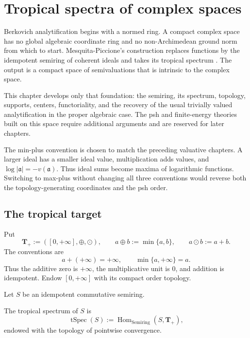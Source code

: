 \chapter{Tropical spectra of complex spaces}
\label{chap:tropical-spectra-complex}

Berkovich analytification begins with a normed ring.
A compact complex space has no global algebraic coordinate ring and no
non-Archimedean ground norm from which to start.
Mesquita-Piccione's construction replaces functions by the idempotent
semiring of coherent ideals and takes its tropical spectrum
\cite{MP24}.
The output is a compact space of semivaluations that is intrinsic to the
complex space.

This chapter develops only that foundation:
the semiring, its spectrum, topology, supports, centers, functoriality, and
the recovery of the usual trivially valued analytification in the proper
algebraic case.
The psh and finite-energy theories built on this space require additional
arguments and are reserved for later chapters.

The min-plus convention is chosen to match the preceding valuative
chapters.  A larger ideal has a smaller ideal value, multiplication adds
values, and $\log|\mathfrak a|=-v(\mathfrak a)$.  Thus ideal sums become
maxima of logarithmic functions.  Switching to max-plus without changing
all three conventions would reverse both the topology-generating
coordinates and the psh order.

\section{The tropical target}
\label{sec:ts-target}

Put
\[
 \mathbf T_+:=([0,+\infty],\oplus,\odot),
 \qquad
 a\oplus b:=\min\{a,b\},
 \qquad
 a\odot b:=a+b.
\tag{58.1}\label{eq:ts-tropical-semiring}
\]
The conventions are
\[
                 a+(+\infty)=+\infty,
 \qquad
                 \min\{a,+\infty\}=a.
\]
Thus the additive zero is $+\infty$, the multiplicative unit is $0$,
and addition is idempotent.
Endow $[0,+\infty]$ with its compact order topology.

Let $S$ be an idempotent commutative semiring.

\begin{samepage}
\begin{definition}
\label{def:ts-tropical-spectrum}
The tropical spectrum of $S$ is
\[
 \operatorname{tSpec}(S)
       :=\operatorname{Hom}_{\mathrm{Semiring}}(S,\mathbf T_+),
\tag{58.2}\label{eq:ts-tSpec}
\]
endowed with the topology of pointwise convergence.
\end{definition}
\end{samepage}

